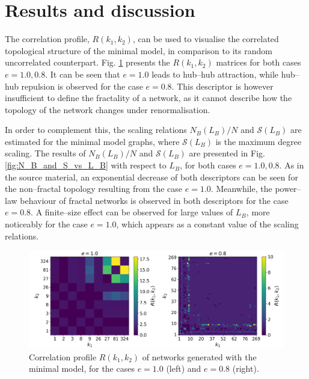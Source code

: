 \section{Results and discussion}

The correlation profile, $R(k_1,k_2)$, can be used to visualise the correlated topological structure of the minimal model, in comparison to its random uncorrelated counterpart. Fig. \ref{fig:R_k1_k2_comparison} presents the $R(k_1,k_2)$ matrices for both cases $e=1.0, 0.8$. It can be seen that $e=1.0$ leads to hub--hub attraction, while hub--hub repulsion is observed for the case $e=0.8$. This descriptor is however insufficient to define the fractality of a network, as it cannot describe how the topology of the network changes under renormalisation. 

In order to complement this, the scaling relations $N_B(L_B) / N$ and $\mathcal{S}(L_B)$ are estimated for the minimal model graphs, where $\mathcal{S}(L_B)$ is the maximum degree scaling. The results of $N_B(L_B) / N$ and $\mathcal{S}(L_B)$ are presented in Fig. \ref{fig:N_B_and_S_vs_L_B} with respect to $L_B$, for both cases $e=1.0, 0.8$. As in the source material, an exponential decrease of both descriptors can be seen for the non--fractal topology resulting from the case $e=1.0$. Meanwhile, the power--law behaviour of fractal networks is observed in both descriptors for the case $e=0.8$. A finite--size effect can be observed for large values of $L_B$, more noticeably for the case $e=1.0$, which appears as a constant value of the scaling relations.

\begin{figure}[!h]
	\begin{center}
	\includegraphics[scale=0.46]{./images/task_6/R_k1_k2_comparison.png} 
	\end{center}
	\caption{Correlation profile $R(k_1, k_2)$ of networks generated with the minimal model, for the cases $e=1.0$ (left) and $e=0.8$ (right). \\} 
	\label{fig:R_k1_k2_comparison} 
\end{figure}

